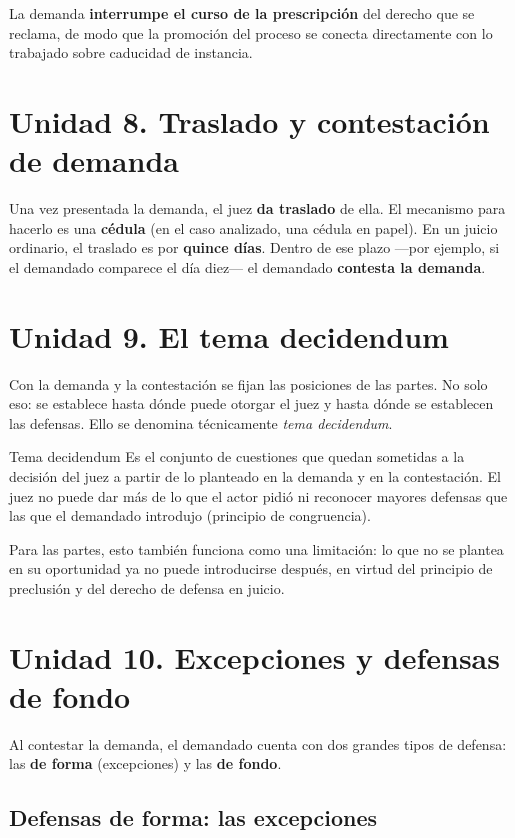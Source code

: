 \documentclass[12pt,oneside]{book}
\begin{document}
La demanda \textbf{interrumpe el curso de la prescripción} del derecho que se reclama, de modo que la promoción del proceso se conecta directamente con lo trabajado sobre caducidad de instancia.

\section{Unidad 8. Traslado y contestación de demanda}

Una vez presentada la demanda, el juez \textbf{da traslado} de ella. El mecanismo para hacerlo es una \textbf{cédula} (en el caso analizado, una cédula en papel). En un juicio ordinario, el traslado es por \textbf{quince días}. Dentro de ese plazo ---por ejemplo, si el demandado comparece el día diez--- el demandado \textbf{contesta la demanda}.

\section{Unidad 9. El tema decidendum}

Con la demanda y la contestación se fijan las posiciones de las partes. No solo eso: se establece hasta dónde puede otorgar el juez y hasta dónde se establecen las defensas. Ello se denomina técnicamente \textit{tema decidendum}.

\begin{definition}{Tema decidendum}
Es el conjunto de cuestiones que quedan sometidas a la decisión del juez a partir de lo planteado en la demanda y en la contestación. El juez no puede dar más de lo que el actor pidió ni reconocer mayores defensas que las que el demandado introdujo (principio de congruencia).
\end{definition}

Para las partes, esto también funciona como una limitación: lo que no se plantea en su oportunidad ya no puede introducirse después, en virtud del principio de preclusión y del derecho de defensa en juicio.

\section{Unidad 10. Excepciones y defensas de fondo}

Al contestar la demanda, el demandado cuenta con dos grandes tipos de defensa: las \textbf{de forma} (excepciones) y las \textbf{de fondo}.

\subsection{Defensas de forma: las excepciones}
\end{document}
